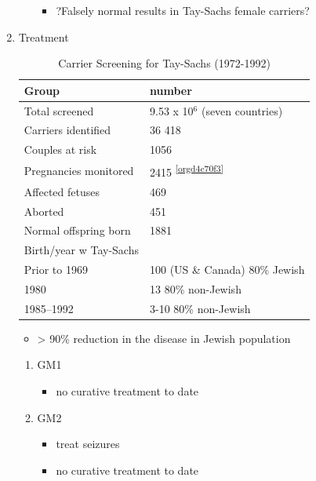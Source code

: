 \documentclass{scrartcl}
\begin{document}
\begin{enumerate}
\begin{enumerate}
\begin{itemize}
\item ?Falsely normal results in Tay-Sachs female carriers?
\end{itemize}
\end{enumerate}

\item Treatment
\label{sec:org00eb638}
\begin{table}[htbp]
\caption{\label{tab:org79fbeb8}
Carrier Screening for Tay-Sachs (1972-1992)}
\centering
\begin{tabular}{ll}
Group & number\\
\hline
Total screened & 9.53 x 10\(^{\text{6}}\) (seven countries)\\
Carriers identified & 36 418\\
Couples at risk & 1056\\
Pregnancies monitored & 2415 \textsuperscript{\ref{orgd4c70f3}}\\
Affected fetuses & 469\\
Aborted & 451\\
Normal offspring born & 1881\\
Birth/year w Tay-Sachs & \\
Prior to 1969 & 100 (US \& Canada) 80\% Jewish\\
1980 & 13 80\% non-Jewish\\
1985–1992 & 3-10 80\% non-Jewish\\
\end{tabular}
\end{table}

\begin{itemize}
\item > 90\% reduction in the disease in Jewish population
\end{itemize}

\begin{enumerate}
\item GM1
\label{sec:org711832a}
\begin{itemize}
\item no curative treatment to date
\end{itemize}
\item GM2
\label{sec:orgac19924}
\begin{itemize}
\item treat seizures
\item no curative treatment to date
\end{itemize}
\end{enumerate}
\end{enumerate}
\end{document}
